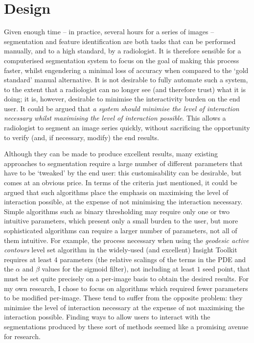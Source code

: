 \chapter{Design}

Given enough time -- in practice, several hours for a series of images -- segmentation and feature identification are both tasks that can be performed manually, and to a high standard, by a radiologist. It is therefore sensible for a computerised segmentation system to focus on the goal of making this process faster, whilst engendering a minimal loss of accuracy when compared to the `gold standard' manual alternative. It is not desirable to fully automate such a system, to the extent that a radiologist can no longer see (and therefore trust) what it is doing; it is, however, desirable to minimise the interactivity burden on the end user. It could be argued that \emph{a system should minimise the level of interaction necessary whilst maximising the level of interaction possible}. This allows a radiologist to segment an image series quickly, without sacrificing the opportunity to verify (and, if necessary, modify) the end results.

Although they can be made to produce excellent results, many existing approaches to segmentation require a large number of different parameters that have to be `tweaked' by the end user: this customisability can be desirable, but comes at an obvious price. In terms of the criteria just mentioned, it could be argued that such algorithms place the emphasis on maximising the level of interaction possible, at the expense of not minimising the interaction necessary. Simple algorithms such as binary thresholding may require only one or two intuitive parameters, which present only a small burden to the user, but more sophisticated algorithms can require a larger number of parameters, not all of them intuitive. For example, the process necessary when using the \emph{geodesic active contours} level set algorithm in the widely-used (and excellent) Insight Toolkit \cite{?} requires at least 4 parameters (the relative scalings of the terms in the PDE  and the $\alpha$ and $\beta$ values for the sigmoid filter), not including at least $1$ seed point, that must be set quite precisely on a per-image basis to obtain the desired results. For my own research, I chose to focus on algorithms which required fewer parameters to be modified per-image. These tend to suffer from the opposite problem: they minimise the level of interaction necessary at the expense of not maximising the interaction possible. Finding ways to allow users to interact with the segmentations produced by these sort of methods seemed like a promising avenue for research.

